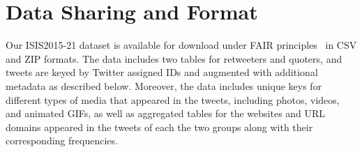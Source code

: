 \documentclass[letterpaper]{article}
\begin{document}
\begin{table}[!htbp]
\centering
{}
\quad
{}
\caption{Distributions of top-10 frequent languages used in our tweets' texts. ``Other'' includes 38 and 49 other languages that were identified in our collection with lower frequencies for Retweeters and Quoters respectively. Numbers represent the number of tweets that are written in the corresponding languages.}
\label{table:labguages}
\end{table}


\section{Data Sharing and Format}
Our ISIS2015-21 dataset is available for download under FAIR principles~\cite{wilkinson2016fair} in CSV and ZIP formats. The data includes two tables for retweeters and quoters, and tweets are keyed by Twitter assigned IDs and augmented with additional metadata as described below. Moreover, the data includes unique keys for different types of media that appeared in the tweets, including photos, videos, and animated GIFs, as well as aggregated tables for the websites and URL domains appeared in the tweets of each the two groups along with their corresponding frequencies.
\end{document}

